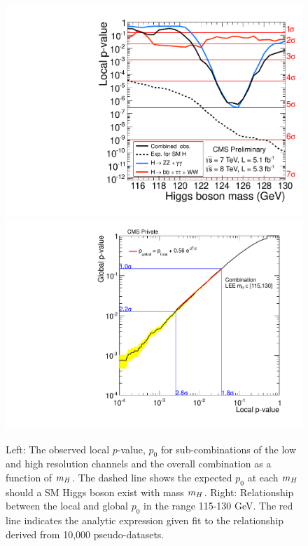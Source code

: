\begin{figure}
\begin{center}
\includegraphics[width=.49\textwidth]{combinations/ichep2012/sqr_pvala_all_byresol.pdf}
\includegraphics[width=.49\textwidth]{combinations/ichep2012/lee-combination-115-130.pdf}
\caption{Left: The observed local $p$-value, $p_{0}$ for sub-combinations of the low and
high resolution channels and the overall combination as a function of $m_{H}$. The dashed
line shows the expected $p_{0}$ at each $m_{H}$ should a SM Higgs boson exist with mass $m_{H}$.
Right: Relationship between the local and global $p_{0}$ in the range 115-130 GeV.
The red line indicates the analytic expression given fit to the relationship derived from
10,000 pseudo-datasets.}
\label{fig:combinedpval}
\end{center}
\end{figure}
